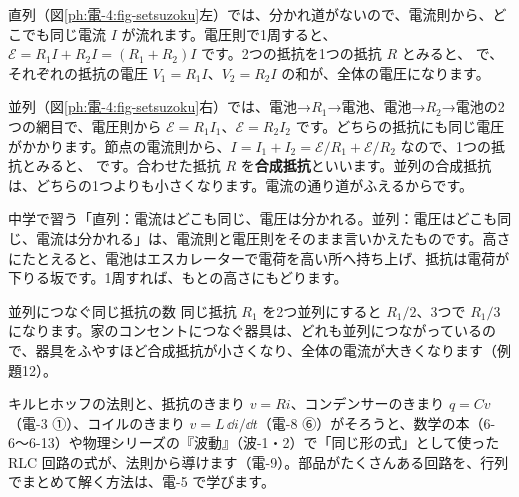 直列（図\ref{ph:電-4:fig-setsuzoku}左）では、分かれ道がないので、電流則から、どこでも同じ電流 $I$ が流れます。電圧則で1周すると、$\mathcal E=R_1I+R_2I=(R_1+R_2)I$ です。2つの抵抗を1つの抵抗 $R$ とみると、
で、それぞれの抵抗の電圧 $V_1=R_1I$、$V_2=R_2I$ の和が、全体の電圧になります。

並列（図\ref{ph:電-4:fig-setsuzoku}右）では、電池→$R_1$→電池、電池→$R_2$→電池の2つの網目で、電圧則から $\mathcal E=R_1I_1$、$\mathcal E=R_2I_2$ です。どちらの抵抗にも同じ電圧がかかります。節点の電流則から、$I=I_1+I_2=\mathcal E/R_1+\mathcal E/R_2$ なので、1つの抵抗とみると、
\label{ph:電-4:gousei}です。合わせた抵抗 $R$ を\textbf{合成抵抗}といいます。並列の合成抵抗は、どちらの1つよりも小さくなります。電流の通り道がふえるからです。

\begin{phflow}
\end{phflow}

\begin{phyomi}[直列と並列]
中学で習う「直列：電流はどこも同じ、電圧は分かれる。並列：電圧はどこも同じ、電流は分かれる」は、電流則と電圧則をそのまま言いかえたものです。高さにたとえると、電池はエスカレーターで電荷を高い所へ持ち上げ、抵抗は電荷が下りる坂です。1周すれば、もとの高さにもどります。
\end{phyomi}

\begin{phbaisuru}{並列につなぐ同じ抵抗の数}
同じ抵抗 $R_1$ を2つ並列にすると $R_1/2$、3つで $R_1/3$ になります。家のコンセントにつなぐ器具は、どれも並列につながっているので、器具をふやすほど合成抵抗が小さくなり、全体の電流が大きくなります（例題12）。
\end{phbaisuru}

キルヒホッフの法則と、抵抗のきまり $v=Ri$、コンデンサーのきまり $q=Cv$（電-3 ①）、コイルのきまり $v=L\,\dd i/\dd t$（電-8 ⑥）がそろうと、数学の本（6-6〜6-13）や物理シリーズの『波動』（波-1・2）で「同じ形の式」として使った RLC 回路の式が、法則から導けます（電-9）。部品がたくさんある回路を、行列でまとめて解く方法は、電-5 で学びます。

